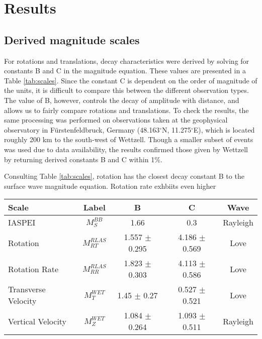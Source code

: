 \documentclass{gji}
\begin{document}
\section{Results}
\subsection{Derived magnitude scales}
For rotations and translations, decay characteristics were derived by solving for constants B and C in the magnitude equation. These values are presented in a Table \ref{tab:scales}. Since the constant C is dependent on the order of magnitude of the units, it is difficult to compare this between the different observation types. The value of B, however, controls the decay of amplitude with distance, and allows us to fairly compare rotations and translations. To check the results, the same processing was performed on observations taken at the geophysical observatory in F\"urstenfeldbruck, Germany (48.163$^\circ$N, 11.275$^\circ$E), which is located roughly 200 km to the south-west of Wettzell. Though a smaller subset of events was used due to data availability, the results confirmed those given by Wettzell by returning derived constants B and C within 1\%.

Consulting Table \ref{tab:scales}, rotation has the closest decay constant B to the surface wave magnitude equation. Rotation rate exhbiits even higher 


\begin{table*}
\begin{minipage}{115mm}
	\begin{center}
		\begin{tabular}{ |l|c|c|c|c| } 
		        \bf{Scale} & \bf{Label} & \bf{B} & \bf{C}  & \bf{Wave}\\ \hline
	IASPEI & $M_{S}^{BB}$ & 1.66 & 0.3  & Rayleigh \\ \hline
        Rotation  & $M^{RLAS}_{RT}$ & 1.557 $\pm$ 0.295 & 4.186 $\pm$ 0.569  & Love \\ \hline
	Rotation Rate & $M^{RLAS}_{RR}$ & 1.823 $\pm$ 0.303 & 4.113 $\pm$ 0.586  & Love\\ \hline 
        Transverse Velocity & $M^{WET}_T$ & 1.45 $\pm$ 0.27 & 0.527 $\pm$ 0.521 & Love \\ \hline
        Vertical Velocity  & $M^{WET}_Z$ & 1.084 $\pm$ 0.264 & 1.093 $\pm$ 0.511  & Rayleigh \\ \hline
		\end{tabular}
		
    		\caption{Magnitude scales and derived constants with 95\% confidence intervals for observations at station RLAS/WET, for equations of the form $M = log_{10}(V/2\pi) + B\cdot log_{10}(\Delta) + C$. The final column gives consideration to the wave type that each instrument component should provide a proxy for.}
		\label{tab:scales}
	\end{center}
	\end{minipage}
\end{table*}
\end{document}
